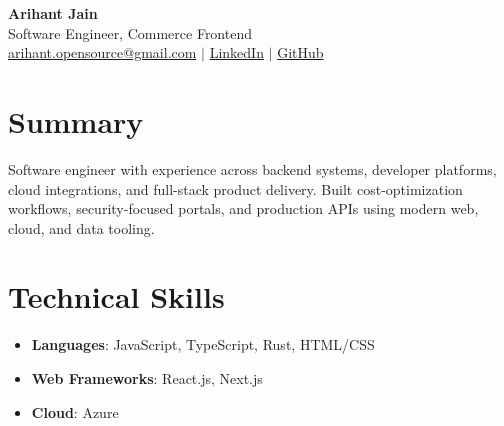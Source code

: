 \documentclass[11pt,a4paper]{article}
\begin{document}
\begin{center}
{\LARGE \textbf{Arihant Jain}}
\\ Software Engineer, Commerce Frontend
\\ \href{mailto:arihant.opensource@gmail.com}{arihant.opensource@gmail.com} $\mid$ \href{https://linkedin.com/in/arihantjain1208}{LinkedIn} $\mid$ \href{https://github.com/Arihant1208}{GitHub}
\end{center}

\section{Summary}
Software engineer with experience across backend systems, developer platforms, cloud integrations, and full-stack product delivery. Built cost-optimization workflows, security-focused portals, and production APIs using modern web, cloud, and data tooling.

\section{Technical Skills}
\begin{itemize}
  \item \textbf{Languages}: JavaScript, TypeScript, Rust, HTML/CSS
  \item \textbf{Web Frameworks}: React.js, Next.js
  \item \textbf{Cloud}: Azure
\end{itemize}
\end{document}
